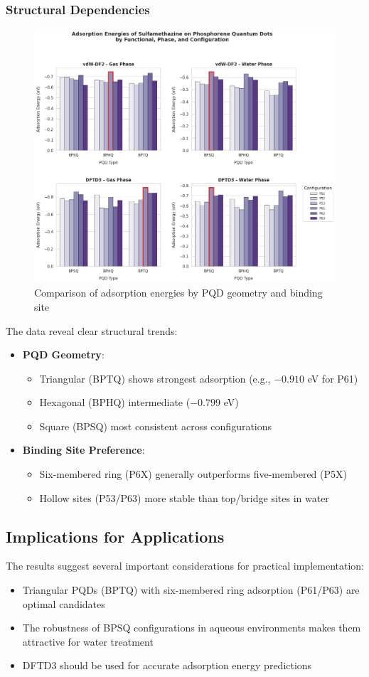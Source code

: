 \documentclass[preprint,12pt]{elsarticle}
\begin{document}
	\subsubsection{Structural Dependencies}
	\begin{figure}[h]
		\centering
		\includegraphics[width=0.8\linewidth]{resumeTable.png}
		\caption{Comparison of adsorption energies by PQD geometry and binding site}
		\label{fig:pqd_comparison}
	\end{figure}
	
	The data reveal clear structural trends:
	\begin{itemize}
		\item \textbf{PQD Geometry}:
		\begin{itemize}
			\item Triangular (BPTQ) shows strongest adsorption (e.g., $-0.910$ eV for P61)
			\item Hexagonal (BPHQ) intermediate ($-0.799$ eV)
			\item Square (BPSQ) most consistent across configurations
		\end{itemize}
		
		\item \textbf{Binding Site Preference}:
		\begin{itemize}
			\item Six-membered ring (P6X) generally outperforms five-membered (P5X)
			\item Hollow sites (P53/P63) more stable than top/bridge sites in water
		\end{itemize}
	\end{itemize}
	
	\subsection{Implications for Applications}
	The results suggest several important considerations for practical implementation:
	\begin{itemize}
		\item Triangular PQDs (BPTQ) with six-membered ring adsorption (P61/P63) are optimal candidates
		\item The robustness of BPSQ configurations in aqueous environments makes them attractive for water treatment
		\item DFTD3 should be used for accurate adsorption energy predictions
	\end{itemize}
	
\end{document}
